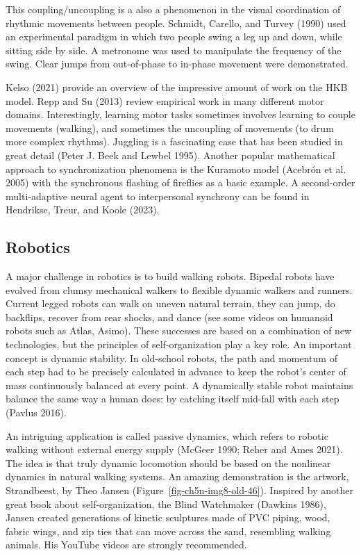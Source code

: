 \documentclass[
  a4paper,
  DIV=11,
  numbers=noendperiod,
  oneside]{scrreprt}
\begin{document}
This coupling/uncoupling is a also a phenomenon in the visual
coordination of rhythmic movements between people. Schmidt, Carello, and
Turvey (1990) used an experimental paradigm in which two people swing a
leg up and down, while sitting side by side. A metronome was used to
manipulate the frequency of the swing. Clear jumps from out-of-phase to
in-phase movement were demonstrated.

Kelso (2021) provide an overview of the impressive amount of work on the
HKB model. Repp and Su (2013) review empirical work in many different
motor domains. Interestingly, learning motor tasks sometimes involves
learning to couple movements (walking), and sometimes the uncoupling of
movements (to drum more complex rhythms). Juggling is a fascinating case
that has been studied in great detail (Peter J. Beek and Lewbel 1995).
Another popular mathematical approach to synchronization phenomena is
the Kuramoto model (Acebrón et al. 2005) with the synchronous flashing
of fireflies as a basic example. A second-order multi-adaptive neural
agent to interpersonal synchrony can be found in Hendrikse, Treur, and
Koole (2023).

\hypertarget{sec-Robotics}{%
\subsection{Robotics}\label{sec-Robotics}}

A major challenge in robotics is to build walking robots. Bipedal robots
have evolved from clumsy mechanical walkers to flexible dynamic walkers
and runners. Current legged robots can walk on uneven natural terrain,
they can jump, do backflips, recover from rear shocks, and dance (see
some videos on humanoid robots such as Atlas, Asimo). These successes
are based on a combination of new technologies, but the principles of
self-organization play a key role. An important concept is dynamic
stability. In old-school robots, the path and momentum of each step had
to be precisely calculated in advance to keep the robot's center of mass
continuously balanced at every point. A dynamically stable robot
maintains balance the same way a human does: by catching itself mid-fall
with each step (Pavlus 2016).

An intriguing application is called passive dynamics, which refers to
robotic walking without external energy supply (McGeer 1990; Reher and
Ames 2021). The idea is that truly dynamic locomotion should be based on
the nonlinear dynamics in natural walking systems. An amazing
demonstration is the artwork, Strandbeest, by Theo Jansen
(Figure~\ref{fig-ch5n-img8-old-46}). Inspired by another great book
about self-organization, the Blind Watchmaker (Dawkins 1986), Jansen
created generations of kinetic sculptures made of PVC piping, wood,
fabric wings, and zip ties that can move across the sand, resembling
walking animals. His YouTube videos are strongly recommended.
\end{document}
